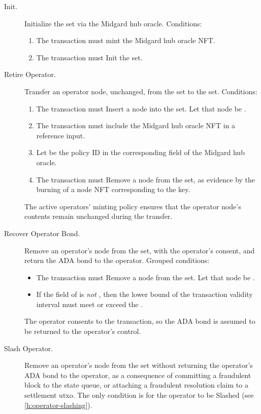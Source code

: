 \documentclass[../midgard.tex]{subfiles}
\begin{document}
\begin{description}
    \item[Init.] Initialize the  set via the Midgard hub oracle.
      Conditions:
        \begin{enumerate}
            \item The transaction must mint the Midgard hub oracle NFT.
            \item The transaction must Init the  set.
        \end{enumerate}
    \item[Retire Operator.] Transfer an operator node, unchanged, from the  set to the  set.
      Conditions:
        \begin{enumerate}
            \item The transaction must Insert a node into the  set.
              Let that node be .
            \item The transaction must include the Midgard hub oracle NFT in a reference input.
            \item Let  be the policy ID in the corresponding field of the Midgard hub oracle.
            \item The transaction must Remove a node from the  set, as evidence by the burning of a  node NFT corresponding to the  key.
        \end{enumerate}
        The active operators' minting policy ensures that the operator node's contents remain unchanged during the transfer.
    \item[Recover Operator Bond.] Remove an operator's node from the  set, with the operator's consent, and return the ADA bond to the operator.
      Grouped conditions:
        \begin{itemize}
            \item The transaction must Remove a node from the  set.
              Let that node be .
            \item If the  field of  is \emph{not} , then the lower bound of the transaction validity interval must meet or exceed the .
        \end{itemize}
    The operator consents to the transaction, so the ADA bond is assumed to be returned to the operator's control.
    \item[Slash Operator.] Remove an operator's node from the  set without returning the operator's ADA bond to the operator, as a consequence of committing a fraudulent block to the state queue, or attaching a fraudulent resolution claim to a settlement utxo.
      The only condition is for the operator to be Slashed (see \cref{h:operator-slashing}).
\end{description}
\end{document}

